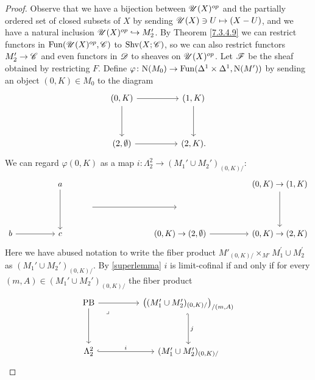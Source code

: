 \documentclass[../../thesis.tex]{subfiles}
\begin{document}
\begin{proof}
    Observe that we have a bijection between $\mathscr{U}(X)^{op}$ and the partially ordered set of closed subsets of $X$ by sending $\mathscr{U}(X) \ni U \mapsto (X - U)$, and we have a natural inclusion $\mathscr{U}(X)^{op} \hookrightarrow M_2'$.
    By Theorem \ref{7.3.4.9} we can restrict functors in $\mathrm{Fun}(\mathscr{U}(X)^{op}, \mathscr{C})$ to $\mathrm{Shv}(X;\mathscr{C})$, so we can also restrict functors $M_2'\to \mathscr{C}$ and even functors in $\mathscr{D}$ to sheaves on $\mathscr{U}(X)^{op}$.
    Let $\mathscr{F}$ be the sheaf obtained by restricting $F$.
    Define $\varphi\colon\mathrm{N}(M_0) \to \mathrm{Fun}(\Delta^1\times \Delta^1, \mathrm{N}(M'))$ by sending an object $(0,K) \in M_0$ to the diagram
    \[\begin{tikzcd}
            {(0,K)} && {(1,K)} \\
            \\
            {(2,\emptyset)} && {(2,K)}
            \arrow[from=1-1, to=1-3]
            \arrow[from=1-3, to=3-3]
            \arrow[from=3-1, to=3-3]
            \arrow[from=1-1, to=3-1].
        \end{tikzcd}\]
    We can regard $\varphi(0,K)$ as a map $i: \Lambda_2^2 \to (M_1'\cup M_2')_{(0,K)/}$:
    \[\begin{tikzcd}
            && a &&&&&& {(0,K)\to(1,K)} \\
            &&& {} &&& {} \\
            b && c &&&& {(0,K)\to(2,\emptyset)} && {(0,K)\to(2,K)}
            \arrow[from=1-9, to=3-9]
            \arrow[from=3-7, to=3-9]
            \arrow[from=3-1, to=3-3]
            \arrow[from=1-3, to=3-3]
            \arrow[from=2-4, to=2-7]
        \end{tikzcd}\]
    Here we have abused notation to write the fiber product $M'_{(0, K) /} \times_{M'}M_1^{\prime} \cup M_2^{\prime}$ as $ (M_1'\cup M_2')_{(0,K)/}$. By \ref{superlemma} $i$ is limit-cofinal if and only if for every $(m,A) \in (M_1'\cup M_2')_{(0,K)/}$ the fiber product
    \[\begin{tikzcd}
            {\mathrm{PB}} && {\left((M_1'\cup M_2')_{(0,K)/}\right)_{/(m,A)}} \\
            \\
            {\Lambda_2^2} && {(M_1'\cup M_2')_{(0,K)/}}
            \arrow[from=1-1, to=1-3]
            \arrow["j", hook',from=1-3, to=3-3]
            \arrow["i", hook,from=3-1, to=3-3]
            \arrow[from=1-1, to=3-1]
            \arrow["\lrcorner"{anchor=center, pos=0.125}, draw=none, from=1-1, to=3-3]
        \end{tikzcd}\]

\end{proof}
\end{document}
